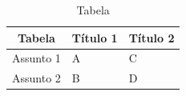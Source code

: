 \begin{table}[!h]
\centering
\begin{tabular}{l|l|l}
\hline
\multicolumn{1}{c|}{\textbf{Tabela}} & \multicolumn{1}{c|}{\textbf{Título 1}} & \multicolumn{1}{c}{\textbf{Título 2}} \\ \hline
Assunto 1                            & A                                      & C                                     \\ \hline
Assunto 2                            & B                                      & D                                     \\ \hline
\end{tabular}
\caption{Tabela}\label{tab:tabela}
\end{table}


